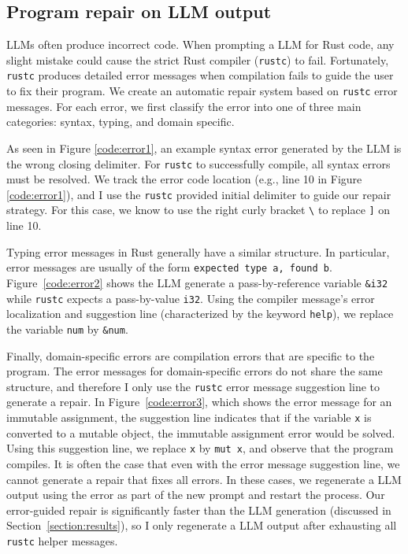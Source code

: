 \documentclass[12pt,openany,oneside,table]{cmuthesis}
\begin{document}
\subsection{Program repair on LLM output}
\label{sec:repair}
LLMs often produce incorrect code. When prompting a LLM for Rust code, any slight mistake could cause the strict Rust compiler (\lstinline{rustc}) to fail. Fortunately, \lstinline{rustc} produces detailed error messages when compilation fails to guide the user to fix their program. We create an automatic repair system based on \lstinline{rustc} error messages. For each error, we first classify the error into one of three main categories: syntax, typing, and domain specific. 


As seen in Figure \ref{code:error1}, an example syntax error generated by the LLM is the wrong closing delimiter. For \lstinline{rustc} to successfully compile, all syntax errors must be resolved. We track the error code location (e.g., line 10 in Figure \ref{code:error1}), and I use the \lstinline{rustc} provided initial delimiter to guide our repair strategy. For this case, we know to use the right curly bracket \lstinline{\} to replace \lstinline{]} on line 10. 

Typing error messages in Rust generally have a similar structure. In particular, error messages are usually of the form \lstinline{expected type a, found b}. Figure~\ref{code:error2} shows the LLM generate a pass-by-reference variable \lstinline{&i32} while \lstinline{rustc} expects a pass-by-value \lstinline{i32}. Using the compiler message's error localization and suggestion line (characterized by the keyword \lstinline{help}), we replace the variable \lstinline{num} by \lstinline{&num}. 

Finally, domain-specific errors are compilation errors that are specific to the program. The error messages for domain-specific errors do not share the same structure, and therefore I only use the \lstinline{rustc} error message suggestion line to generate a repair. In Figure~\ref{code:error3}, which shows the error message for an immutable assignment, the suggestion line indicates that if the variable \lstinline{x} is converted to a mutable object, the immutable assignment error would be solved. Using this suggestion line, we replace \lstinline{x} by \lstinline{mut x}, and observe that the program compiles. It is often the case that even with the error message suggestion line, we cannot generate a repair that fixes all errors. In these cases, we regenerate a LLM output using the error as part of the new prompt and restart the process. Our error-guided repair is significantly faster than the LLM generation (discussed in Section~\ref{section:results}), so I only regenerate a LLM output after exhausting all \lstinline{rustc} helper messages.
\end{document}

